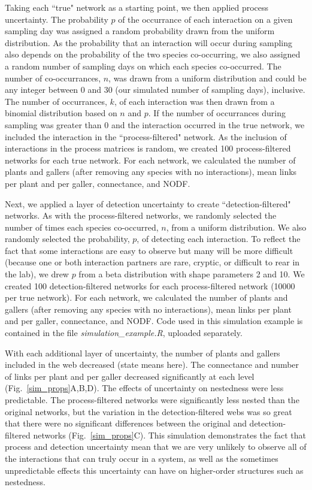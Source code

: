 \documentclass[12pt]{article}
\begin{document}
  Taking each ``true" network as a starting point, we then applied process uncertainty. The probability $p$ of the occurrance of each interaction on a given sampling day was assigned a random probability drawn from the uniform distribution. As the probability that an interaction will occur during sampling also depends on the probability of the two species co-occurring, we also assigned a random number of sampling days on which each species co-occurred. The number of co-occurrances, $n$, was drawn from a uniform distribution and could be any integer between 0 and 30 (our simulated number of sampling days), inclusive. The number of occurrances, $k$, of each interaction was then drawn from a binomial distribution based on $n$ and $p$. If the number of occurrances during sampling was greater than 0 and the interaction occurred in the true network, we included the interaction in the ``process-filtered" network. As the inclusion of interactions in the process matrices is random, we created 100 process-filtered networks for each true network. For each network, we calculated the number of plants and gallers (after removing any species with no interactions), mean links per plant and per galler, connectance, and NODF.


  Next, we applied a layer of detection uncertainty to create ``detection-filtered" networks. As with the process-filtered networks, we randomly selected the number of times each species co-occurred, $n$, from a uniform distribution. We also randomly selected the probability, $p$, of detecting each interaction. To reflect the fact that some interactions are easy to observe but many will be more difficult (because one or both interaction partners are rare, cryptic, or difficult to rear in the lab), we drew $p$ from a beta distribution with shape parameters 2 and 10. We created 100 detection-filtered networks for each process-filtered network (10000 per true network). For each network, we calculated the number of plants and gallers (after removing any species with no interactions), mean links per plant and per galler, connectance, and NODF. Code used in this simulation example is contained in the file \emph{simulation\_example.R}, uploaded separately.


  With each additional layer of uncertainty, the number of plants and gallers included in the web decreased (state means here). The connectance and number of links per plant and per galler decreased significantly at each level (Fig.~\ref{sim_props}A,B,D). The effects of uncertainty on nestedness were less predictable. The process-filtered networks were significantly less nested than the original networks, but the variation in the detection-filtered webs was so great that there were no significant differences between the original and detection-filtered networks (Fig.~\ref{sim_props}C). This simulation demonstrates the fact that process and detection uncertainty mean that we are very unlikely to observe all of the interactions that can truly occur in a system, as well as the sometimes unpredictable effects this uncertainty can have on higher-order structures such as nestedness.
\end{document}
